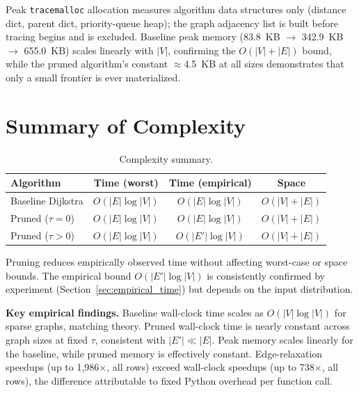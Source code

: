 \noindent Peak \texttt{tracemalloc} allocation measures algorithm data structures only (distance dict, parent dict, priority-queue heap); the graph adjacency list is built before tracing begins and is excluded. Baseline peak memory (83.8~KB $\to$ 342.9~KB $\to$ 655.0~KB) scales linearly with $|V|$, confirming the $O(|V|+|E|)$ bound, while the pruned algorithm's constant $\approx$4.5~KB at all sizes demonstrates that only a small frontier is ever materialized.

\section{Summary of Complexity}

\begin{table}[htbp]
\centering
\renewcommand{\arraystretch}{1.4}
\small
\begin{tabular}{@{}lccc@{}}
\toprule
\textbf{Algorithm} & \textbf{Time (worst)} & \textbf{Time (empirical)} & \textbf{Space} \\
\midrule
Baseline Dijkstra & $O(|E|\log|V|)$ & $O(|E|\log|V|)$ & $O(|V|+|E|)$ \\
Pruned ($\tau=0$) & $O(|E|\log|V|)$ & $O(|E|\log|V|)$ & $O(|V|+|E|)$ \\
Pruned ($\tau>0$) & $O(|E|\log|V|)$ & $O(|E'|\log|V|)$ & $O(|V|+|E|)$ \\
\bottomrule
\end{tabular}
\caption[Complexity summary]{Complexity summary.}
\label{table:complexity_summary}
\end{table}

\noindent Pruning reduces empirically observed time without affecting worst-case or space bounds. The empirical bound $O(|E'|\log|V|)$ is consistently confirmed by experiment (Section~\ref{sec:empirical_time}) but depends on the input distribution.

\noindent\textbf{Key empirical findings.}
Baseline wall-clock time scales as $O(|V|\log|V|)$ for sparse graphs, matching theory. Pruned wall-clock time is nearly constant across graph sizes at fixed $\tau$, consistent with $|E'| \ll |E|$. Peak memory scales linearly for the baseline, while pruned memory is effectively constant. Edge-relaxation speedups (up to 1,986$\times$, all rows) exceed wall-clock speedups (up to 738$\times$, all rows), the difference attributable to fixed Python overhead per function call.
